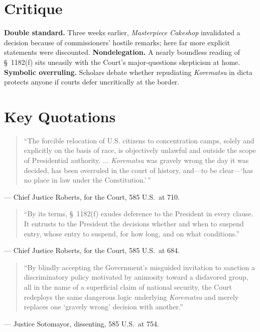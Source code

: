 \documentclass[12pt]{article}
\begin{document}
\section{Critique}

\textbf{Double standard.} Three weeks earlier, \textit{Masterpiece Cakeshop} invalidated a decision because of commissioners' hostile remarks; here far more explicit statements were discounted. \textbf{Nondelegation.} A nearly boundless reading of \S~1182(f) sits uneasily with the Court's major-questions skepticism at home. \textbf{Symbolic overruling.} Scholars debate whether repudiating \textit{Korematsu} in dicta protects anyone if courts defer uncritically at the border.

\section{Key Quotations}

\begin{quote}
``The forcible relocation of U.S. citizens to concentration camps, solely and explicitly on the basis of race, is objectively unlawful and outside the scope of Presidential authority. ... \textit{Korematsu} was gravely wrong the day it was decided, has been overruled in the court of history, and---to be clear---`has no place in law under the Constitution.'\,''
\end{quote}
\noindent --- Chief Justice Roberts, for the Court, 585 U.S.\ at 710.

\begin{quote}
``By its terms, \S~1182(f) exudes deference to the President in every clause. It entrusts to the President the decisions whether and when to suspend entry, whose entry to suspend, for how long, and on what conditions.''
\end{quote}
\noindent --- Chief Justice Roberts, for the Court, 585 U.S.\ at 684.

\begin{quote}
``By blindly accepting the Government's misguided invitation to sanction a discriminatory policy motivated by animosity toward a disfavored group, all in the name of a superficial claim of national security, the Court redeploys the same dangerous logic underlying \textit{Korematsu} and merely replaces one `gravely wrong' decision with another.''
\end{quote}
\noindent --- Justice Sotomayor, dissenting, 585 U.S.\ at 754.
\end{document}
